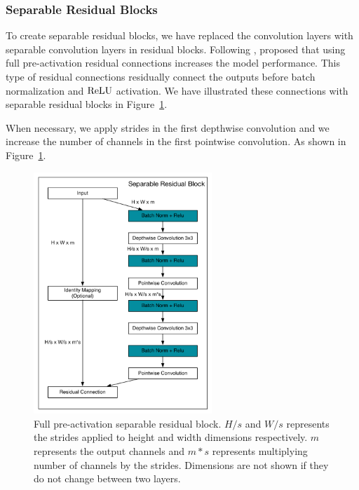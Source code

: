 \subsubsection{Separable Residual Blocks}
To create separable residual blocks, we have replaced the convolution layers with separable convolution layers in residual blocks. Following \cite{He:2015aa}, \cite{he2016identity} proposed that using full pre-activation residual connections increases the model performance. This type of residual connections residually connect the outputs before batch normalization and $\textrm{ReLU}$ activation. We have illustrated these connections with separable residual blocks in Figure~\ref{fig:full-preactivation}.

When necessary, we apply strides in the first depthwise convolution and we increase the number of channels in the first pointwise convolution. As shown in Figure~\ref{fig:full-preactivation}.

\begin{figure}[!h]
  \begin{center}
    \includegraphics[width=0.6\textwidth]{images/separable_residual_block.pdf}
  \end{center}
  \caption{Full pre-activation separable residual block. $H/s$ and $W/s$ represents the strides applied to height and width dimensions respectively. $m$ represents the output channels and $m*s$ represents multiplying number of channels by the strides. Dimensions are not shown if they do not change between two layers.}
  \label{fig:full-preactivation}
\end{figure}


